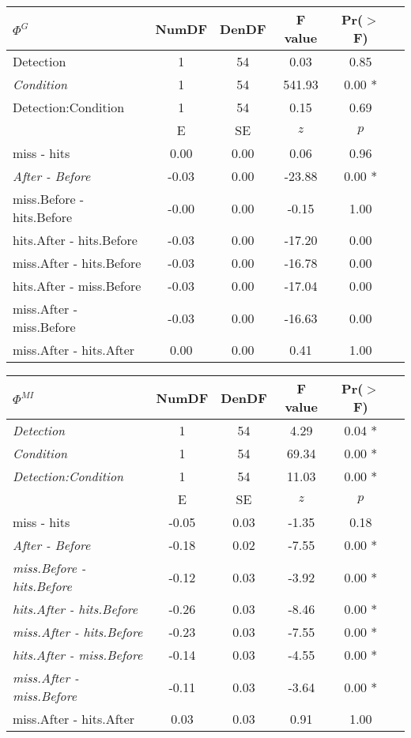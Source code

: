 \begin{table}[!t]
\begin{multicols}{2}
\begin{tabular}{|l|*{5}{c|}}
\hline
\textbf{$\Phi^{G}$} & \textbf{NumDF} & \textbf{DenDF} & \textbf{F value} & \textbf{Pr($>$F)} \\ 
\hline
Detection & 1 & 54 & 0.03 & 0.85 \\ 
\textit{Condition} & 1 & 54 & 541.93 & 0.00 *\\ 
Detection:Condition & 1 & 54 & 0.15 & 0.69 \\ 
\hline
& E & SE & $z$ & $p$ \\
\hline
miss - hits & 0.00 & 0.00 & 0.06 & 0.96 \\ 
\hline
\textit{After - Before} & -0.03 & 0.00 & -23.88 & 0.00 * \\ 
\hline
miss.Before - hits.Before & -0.00 & 0.00 & -0.15 & 1.00 \\ 
hits.After - hits.Before & -0.03 & 0.00 & -17.20 & 0.00 \\ 
miss.After - hits.Before & -0.03 & 0.00 & -16.78 & 0.00 \\ 
hits.After - miss.Before & -0.03 & 0.00 & -17.04 & 0.00 \\ 
miss.After - miss.Before & -0.03 & 0.00 & -16.63 & 0.00 \\ 
miss.After - hits.After & 0.00 & 0.00 & 0.41 & 1.00 \\ 
\hline
\end{tabular}

\vspace{0.5cm}

\begin{tabular}{|l|*{5}{c|}}
\hline
\textbf{$\Phi^{MI}$} & \textbf{NumDF} & \textbf{DenDF} & \textbf{F value} & \textbf{Pr($>$F)} \\ 
\hline
\textit{Detection} & 1 & 54 & 4.29 & 0.04 * \\ 
\textit{Condition} & 1 & 54 & 69.34 & 0.00 * \\ 
\textit{Detection:Condition} & 1 & 54 & 11.03 & 0.00 * \\ 
\hline
& E & SE & $z$ & $p$ \\
\hline
miss - hits & -0.05 & 0.03 & -1.35 & 0.18 \\ 
\hline
\textit{After - Before} & -0.18 & 0.02 & -7.55 & 0.00 * \\ 
\hline
\textit{miss.Before - hits.Before} & -0.12 & 0.03 & -3.92 & 0.00 * \\ 
\textit{hits.After - hits.Before} & -0.26 & 0.03 & -8.46 & 0.00 * \\ 
\textit{miss.After - hits.Before} & -0.23 & 0.03 & -7.55 & 0.00 * \\ 
\textit{hits.After - miss.Before} & -0.14 & 0.03 & -4.55 & 0.00 * \\ 
\textit{miss.After - miss.Before} & -0.11 & 0.03 & -3.64 & 0.00 * \\ 
miss.After - hits.After & 0.03 & 0.03 & 0.91 & 1.00 \\ 
\hline
\end{tabular} 


\end{multicols}
\end{table}
